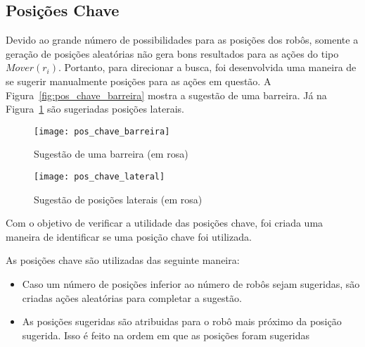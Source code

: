 \subsection{Posições Chave}\label{subsec:pos_chave}

Devido ao grande número de possibilidades para
as posições dos robôs, somente a geração de
posições aleatórias não gera bons resultados
para as ações do tipo $Mover(r_i)$. Portanto,
para direcionar a busca, foi desenvolvida uma
maneira de se sugerir manualmente posições para
as ações em questão. A Figura~\ref{fig:pos_chave_barreira}
mostra a sugestão de uma barreira. Já na
Figura~\ref{fig:pos_chave_lateral} são sugeriadas
posições laterais. 

\begin{figure}[H]
  \centering
  \texttt{[image: pos\_chave\_barreira]}
  \caption{Sugestão de uma barreira (em rosa)}\label{fig:pos_chave_barreira}
  \texttt{[image: pos\_chave\_lateral]}
  \caption{Sugestão de posições laterais (em rosa)}\label{fig:pos_chave_lateral}
\end{figure}

Com o objetivo de verificar a utilidade das posições chave,
foi criada uma maneira de identificar se uma posição chave
foi utilizada.

As posições chave são utilizadas das seguinte maneira:
\begin{itemize}
  \item Caso um número de posições inferior ao número de
        robôs sejam sugeridas, são criadas ações aleatórias
        para completar a sugestão. 
  \item As posições sugeridas são atribuidas para o robô
        mais próximo da posição sugerida. Isso é feito
        na ordem em que as posições foram sugeridas
\end{itemize}

